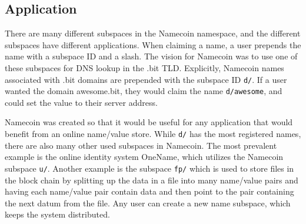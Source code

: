 \subsection{Application}

There are many different subspaces in the Namecoin namespace, and the different subspaces have different applications. When claiming a name, a user prepends the name with a subspace ID and a slash. The vision for Namecoin was to use one of these subspaces for DNS lookup in the .bit TLD. Explicitly, Namecoin names associated with .bit domains are prepended with the subspace ID {\tt d/}. If a user wanted the domain awesome.bit, they would claim the name {\tt d/awesome}, and could set the value to their server address. 

Namecoin was created so that it would be useful for any application that would benefit from an online name/value store. While {\tt d/} has the most registered names, there are also many other used subspaces in Namecoin. The most prevalent example is the online identity system OneName, which utilizes the Namecoin subspace {\tt u/}. Another example is the subspace {\tt fp/} which is used to store files in the block chain by splitting up the data in a file into many name/value pairs and having each name/value pair contain data and then point to the pair containing the next datum from the file.  Any user can create a new name subspace, which keeps the system distributed. 

